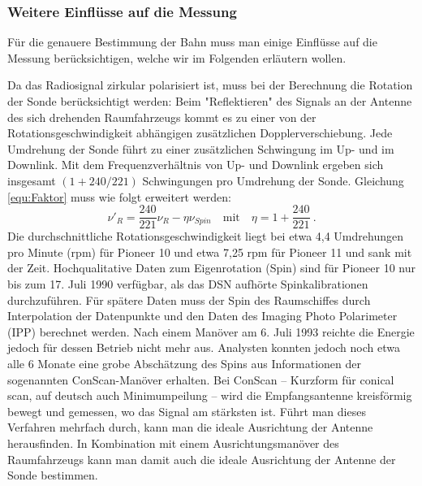 \subsubsection{Weitere Einflüsse auf die Messung}\label{einfluesse}
Für die genauere Bestimmung der Bahn muss man einige Einflüsse auf die Messung berücksichtigen, welche wir im Folgenden erläutern wollen.

Da das Radiosignal zirkular polarisiert ist, muss bei der Berechnung die Rotation der Sonde berücksichtigt werden: Beim "Reflektieren" des Signals an der Antenne des sich drehenden Raumfahrzeugs kommt es zu einer von der Rotationsgeschwindigkeit abhängigen zusätzlichen Dopplerverschiebung. Jede Umdrehung der Sonde führt zu einer zusätzlichen Schwingung im Up- und im Downlink. Mit dem Frequenzverhältnis von Up- und Downlink ergeben sich insgesamt $(1+240/221)$ Schwingungen pro Umdrehung der Sonde\cite{Anderson2002}. %
Gleichung \ref{equ:Faktor} muss wie folgt erweitert werden:
\begin{equation}
\nu'_R = \frac{240}{221}\nu_R - \eta\nu_{Spin} \quad \mathrm{mit}  \quad \eta = 1+ \frac{240}{221}\ .
\end{equation}
Die durchschnittliche Rotationsgeschwindigkeit liegt bei etwa 4,4 Umdrehungen pro Minute (rpm) für Pioneer 10 und etwa 7,25 rpm für Pioneer 11 und sank mit der Zeit\cite{Anderson2002}.
Hochqualitative Daten zum Eigenrotation (Spin) sind für Pioneer 10 nur bis zum 17. Juli 1990 verfügbar, als das DSN aufhörte Spinkalibrationen durchzuführen. Für spätere Daten muss der Spin des Raumschiffes durch Interpolation der Datenpunkte und den Daten des Imaging Photo Polarimeter (IPP) berechnet werden. Nach einem Manöver am 6. Juli 1993 reichte die Energie jedoch für dessen Betrieb nicht mehr aus. Analysten konnten jedoch noch etwa alle 6 Monate eine grobe Abschätzung des Spins aus Informationen der sogenannten ConScan-Manöver erhalten. %
Bei ConScan – Kurzform für conical scan, auf deutsch auch Minimumpeilung – wird die Empfangsantenne kreisförmig bewegt und gemessen, wo das Signal am stärksten ist. Führt man dieses Verfahren mehrfach durch, kann man die ideale Ausrichtung der Antenne herausfinden. In Kombination mit einem Ausrichtungsmanöver des Raumfahrzeugs kann man damit auch die ideale Ausrichtung der Antenne der Sonde bestimmen.\cite{Anderson2002}
